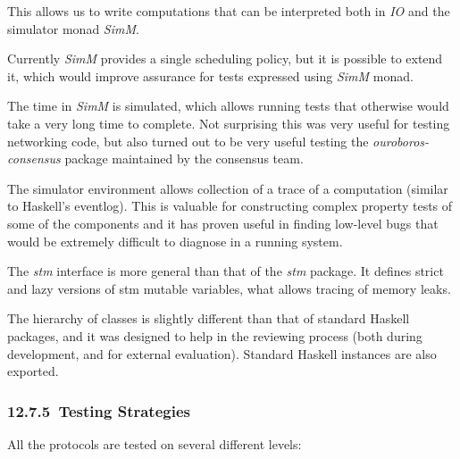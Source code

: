 \documentclass[11pt,a4paper]{article}
\begin{document}
This allows us to write computations that can be interpreted both in
\emph{IO} and the simulator monad \emph{SimM}.

Currently \emph{SimM} provides a single scheduling policy, but it is
possible to extend it, which would improve assurance for tests expressed
using \emph{SimM} monad.

The time in \emph{SimM} is simulated, which allows running tests that
otherwise would take a very long time to complete. Not surprising this
was very useful for testing networking code, but also turned out to be
very useful testing the \emph{ouroboros-consensus} package maintained by
the consensus team.

The simulator environment allows collection of a trace of a computation
(similar to Haskell's eventlog). This is valuable for constructing
complex property tests of some of the components and it has proven
useful in finding low-level bugs that would be extremely difficult to
diagnose in a running system.

The \emph{stm} interface is more general than that of the \emph{stm}
package. It defines strict and lazy versions of stm mutable variables,
what allows tracing of memory leaks.

The hierarchy of classes is slightly different than that of standard
Haskell packages, and it was designed to help in the reviewing process
(both during development, and for external evaluation). Standard Haskell
instances are also exported.

\hypertarget{testing-strategies}{%
\subsubsection{​12.7.5​~Testing Strategies}\label{testing-strategies}}

All the protocols are tested on several different levels:
\end{document}
